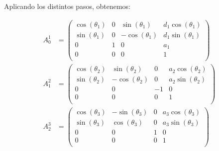 \documentclass[a4paper,12pt]{article}
\begin{document}
Aplicando los distintos pasos, obtenemos:

\begin{align*}
    A_0^1 & =
    \begin{pmatrix}
        \cos{\left(\theta_{1} \right)} & 0 & \sin{\left(\theta_{1} \right)}   & d_{1} \cos{\left(\theta_{1} \right)} \\
        \sin{\left(\theta_{1} \right)} & 0 & - \cos{\left(\theta_{1} \right)} & d_{1} \sin{\left(\theta_{1} \right)} \\
        0                              & 1 & 0                                & a_{1}                                \\
        0                              & 0 & 0                                & 1                                    \\
    \end{pmatrix} \\
    A_1^2 & =
    \begin{pmatrix}
        \cos{\left(\theta_{2} \right)} & \sin{\left(\theta_{2} \right)}   & 0  & a_{2} \cos{\left(\theta_{2} \right)} \\
        \sin{\left(\theta_{2} \right)} & - \cos{\left(\theta_{2} \right)} & 0  & a_{2} \sin{\left(\theta_{2} \right)} \\
        0                              & 0                                & -1 & 0                                    \\
        0                              & 0                                & 0  & 1                                    \\
    \end{pmatrix} \\
    A_2^3 & =
    \begin{pmatrix}
        \cos{\left(\theta_{3} \right)} & - \sin{\left(\theta_{3} \right)} & 0 & a_{3} \cos{\left(\theta_{3} \right)} \\
        \sin{\left(\theta_{3} \right)} & \cos{\left(\theta_{3} \right)}   & 0 & a_{3} \sin{\left(\theta_{3} \right)} \\
        0                              & 0                                & 1 & 0                                    \\
        0                              & 0                                & 0 & 1                                    \\
    \end{pmatrix}
\end{align*}
\end{document}
